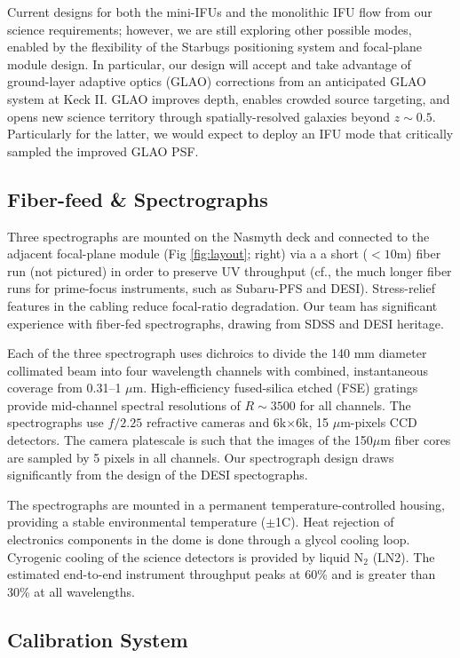 \documentclass[oneside,11pt]{amsart}
\begin{document}
Current designs for both the mini-IFUs and the monolithic IFU flow
from our science requirements; however, we are still exploring other
possible modes, enabled by the flexibility of the Starbugs
positioning system and focal-plane module design. In particular, our
design will accept and take advantage of ground-layer adaptive optics
(GLAO) corrections from an anticipated GLAO system at Keck II. GLAO
improves depth, enables crowded source targeting, and opens new
science territory through spatially-resolved galaxies beyond
$z\sim0.5$. Particularly for the latter, we would expect to deploy an
IFU mode that critically sampled the improved GLAO PSF.

\subsection{Fiber-feed \& Spectrographs}

Three spectrographs are mounted on the Nasmyth deck and connected to
the adjacent focal-plane module (Fig \ref{fig:layout}; right) via a a
short ($< 10$m) fiber run (not pictured) in order to preserve UV
throughput (cf., the much longer fiber runs for prime-focus
instruments, such as Subaru-PFS and DESI). Stress-relief features in
the cabling reduce focal-ratio degradation. Our team has significant
experience with fiber-fed spectrographs, drawing from SDSS and DESI
heritage.

Each of the three spectrograph uses dichroics to divide the 140 mm
diameter collimated beam into four wavelength channels with combined,
instantaneous coverage from 0.31--1 $\mu$m. High-efficiency
fused-silica etched (FSE) gratings provide mid-channel spectral
resolutions of $R \sim 3500$ for all channels. The spectrographs use
$f/2.25$ refractive cameras and 6k$\times$6k, 15 $\mu$m-pixels CCD
detectors. The camera platescale is such that the images of the
150$\mu$m fiber cores are sampled by 5 pixels in all channels. Our
spectrograph design draws significantly from the design of the DESI
spectographs.

The spectrographs are mounted in a permanent temperature-controlled
housing, providing a stable environmental temperature ($\pm$1C). Heat
rejection of electronics components in the dome is done through a
glycol cooling loop. Cyrogenic cooling of the science detectors is
provided by liquid N$_2$ (LN2). The estimated end-to-end instrument
throughput peaks at 60\% and is greater than 30\% at all wavelengths.

\subsection{Calibration System}
\end{document}
